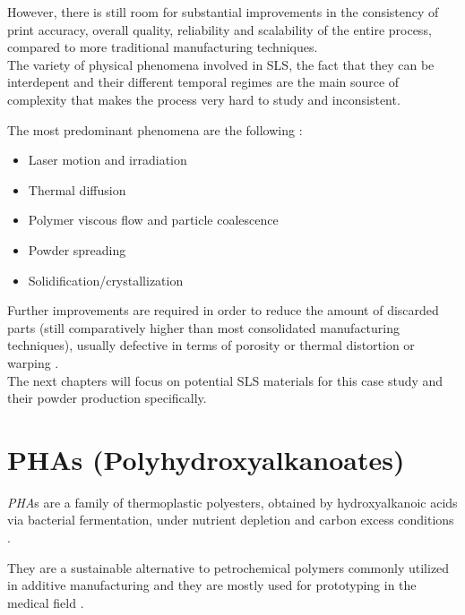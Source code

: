 \documentclass{article}
\begin{document}
    However, there is still room for substantial improvements in the consistency of print accuracy, overall quality, reliability 
    and scalability of the entire process, compared to more traditional manufacturing techniques. \\ 

    The variety of physical phenomena involved in SLS, the fact that they can be interdepent and their different temporal regimes are the main 
    source of complexity that makes the process very hard to study and inconsistent. 

    The most predominant phenomena are the following \autocite*{Padovano_SLS_Review}: 

    \begin{itemize}
        \item Laser motion and irradiation
        \item Thermal diffusion
        \item Polymer viscous flow and particle coalescence 
        \item Powder spreading
        \item Solidification/crystallization 
    \end{itemize} 
    
    Further improvements are required in order to reduce the amount of discarded parts (still comparatively 
    higher than most consolidated manufacturing techniques), usually defective in terms of porosity or 
    thermal distortion or warping \autocite*{Padovano_SLS_Review}. \\ 

    The next chapters will focus on potential SLS materials for this case study and their powder production specifically. \clearpage

    \section{PHAs (Polyhydroxyalkanoates)  \label{PHA_in_general}}

    \textit{PHA}s are a family of thermoplastic polyesters, obtained by hydroxyalkanoic acids via bacterial fermentation, under 
    nutrient depletion and carbon excess conditions \autocites{Kovalcik_PHA_Review}{Messori_Bondioli_PHAs}. 

    They are a sustainable alternative to petrochemical polymers commonly utilized in 
    additive manufacturing and they are mostly used for prototyping in the medical field \autocites{Kovalcik_PHA_Review}{Messori_Bondioli_PHAs}. 
\end{document}
